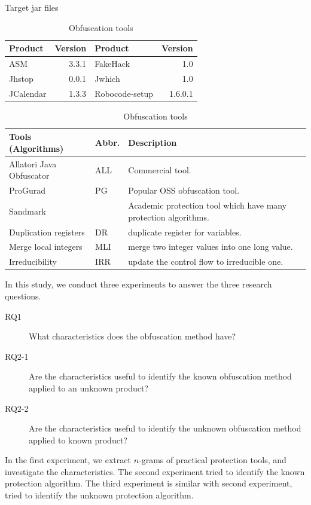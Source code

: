 \documentclass[conference]{IEEEtran}
\begin{document}
\begin{table}[t]
  \centering
  \footnotesize{
    \caption{Target jar files}\label{table:jars}
  \begin{tabular}{l|r||l|r}
    \textbf{Product} & \textbf{Version} & \textbf{Product} & \textbf{Version} \\ \hline
    ASM       & 3.3.1 & FakeHack  & 1.0 \\
    Jhstop    & 0.0.1 & Jwhich    & 1.0  \\
    JCalendar & 1.3.3 & Robocode-setup & 1.6.0.1  \\
  \end{tabular}
  \vspace{0.5cm}
  \caption{Obfuscation tools}\label{table:tools}
  \begin{tabular}{ll|p{4cm}}
      \textbf{Tools (Algorithms)} & \textbf{Abbr.} & \textbf{Description} \\ \hline
      Allatori Java Obfuscator\footnotemark[1] & ALL & Commercial tool. \\ \hline
      ProGurad\footnotemark[2]                 & PG  & Popular OSS obfuscation tool. \\ \hline
      Sandmark\footnotemark[3]                 &     & Academic protection tool which have many protection algorithms. \\
      \hspace{0.1cm} Duplication registers & DR & duplicate register for variables. \\
      \hspace{0.1cm} Merge local integers & MLI & merge two integer values into one long value.\\
      \hspace{0.1cm} Irreducibility       & IRR & update the control flow to irreducible one.\\
  \end{tabular}}
\end{table}

In this study, we conduct three experiments to answer the three
research questions.
\begin{description}
\item[RQ1]   What characteristics does the obfuscation method have?
\item[RQ2-1] Are the characteristics useful to identify the known
  obfuscation method applied to an unknown product?
\item[RQ2-2] Are the characteristics useful to identify the unknown
  obfuscation method applied to known product?
\end{description}
In the first experiment, we extract $n$-grams of practical protection
tools, and investigate the characteristics.
%
The second experiment tried to identify the known protection
algorithm.  The third experiment is similar with second experiment,
tried to identify the unknown protection algorithm.
\end{document}
